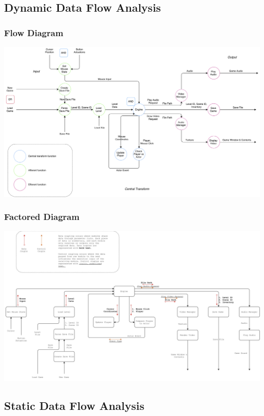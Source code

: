 \documentclass{article}
\begin{document}
	\subsection{Dynamic Data Flow Analysis}
		\subsubsection{Flow Diagram}
			\begin{center}
				\includegraphics[scale=0.40,angle=90]{ddfFlow.png}
			\end{center}
		\subsubsection{Factored Diagram}
			\begin{center}
				\includegraphics[scale=0.36,angle=90]{ddfFactored.png}
			\end{center}
	\subsection{Static Data Flow Analysis}
\end{document}
